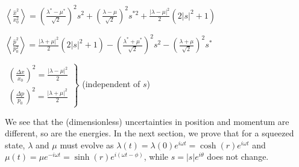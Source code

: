 \documentclass[12pt, twoside]{article}
\begin{document}
$\left\langle \frac { \hat{x} ^ { 2 } } { x_0 ^ { 2 } } \right\rangle = \left( \frac { \lambda ^ { * } - \mu ^ { * } } { \sqrt { 2 } } \right) ^ { 2 } s ^ { 2 } + \left( \frac { \lambda - \mu } { \sqrt { 2 } } \right) ^ { 2 } s ^ { *2 } + \frac { |\lambda - \mu| ^ { 2 } } { 2 } ( 2|s|^2+1 )$

$\left\langle \frac { \hat{p}^2 } { p_0 ^ 2 } \right\rangle  = \frac { | \lambda + \mu | ^ { 2 } } { 2 } \left( 2 | s | ^ { 2 } + 1 \right) - \left( \frac { \lambda^* + \mu ^ { * } } { \sqrt { 2 } } \right) ^ { 2 } s ^ { 2 } - \left( \frac { \lambda + \mu } { \sqrt { 2 } } \right) ^ { 2 } s ^ { * }$


$\left.\begin{array} { l } { \left(\frac{\Delta x}{x_0}\right)^2 = \frac{|\lambda - \mu|^2}{2} } \\ { \left(\frac{\Delta p}{p_0}\right)^2 = \frac{|\lambda + \mu|^2}{2} } \end{array} \right\}$ (independent of $s$)

We see that the (dimensionless) uncertainties in position and momentum are different, so are the energies.
In the next section, we prove that for a squeezed state, $\lambda$ and $\mu$ must evolve as $\lambda(t) = \lambda(0) e^{i\omega t} = \cosh(r) e^{i\omega t}$ and $\mu(t) = \mu e^{-i\omega t} = \sinh(r) e^{i(\omega t - \phi)}$, while $s = |s| e^{i\theta}$ does not change.
\end{document}
